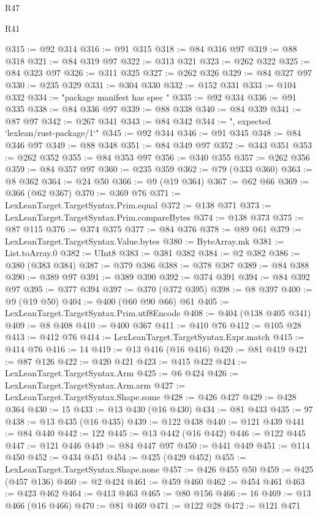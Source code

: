 \begin{lexlean}{R47}
\begin{lexlean}{R41}
\begin{coremodule}
{{{{{{{{{{{{{{{{{{{{{{{{{{{{{{{{{{{{{{{{{{{{{{{{{{{{{{{{{{{{{{{{{{{{{{{{{{{{{{{{{{{{{{{@315 := @92 @314
@316 := @91 @315
@318 := @84 @316 @97
@319 := @88 @318
@321 := @84 @319 @97
@322 := @313 @321
@323 := @262 @322
@325 := @84 @323 @97
@326 := @311 @325
@327 := @262 @326
@329 := @84 @327 @97
@330 := @235 @329
@331 := @304 @330
@332 := @152 @331
@333 := @104 @332
@334 := "package manifest has spec "
@335 := @92 @334
@336 := @91 @335
@338 := @84 @336 @97
@339 := @88 @338
@340 := @84 @339
@341 := @87 @97
@342 := @267 @341
@343 := @84 @342
@344 := ", expected `lexlean/rust-package/1`"
@345 := @92 @344
@346 := @91 @345
@348 := @84 @346 @97
@349 := @88 @348
@351 := @84 @349 @97
@352 := @343 @351
@353 := @262 @352
@355 := @84 @353 @97
@356 := @340 @355
@357 := @262 @356
@359 := @84 @357 @97
@360 := @235 @359
@362 := @79 (@333 @360)
@363 := @8 @362
@364 := @24 @50
@366 := @9 (@19 @364)
@367 := @62 @66
@369 := @366 (@62 @367)
@370 := @369 @76
@371 := LexLeanTarget.TargetSyntax.Prim.equal
@372 := @138 @371
@373 := LexLeanTarget.TargetSyntax.Prim.compareBytes
@374 := @138 @373
@375 := @87 @115
@376 := @374 @375
@377 := @84 @376
@378 := @89 @61
@379 := LexLeanTarget.TargetSyntax.Value.bytes
@380 := ByteArray.mk
@381 := List.toArray.{0}
@382 := UInt8
@383 := @381 @382
@384 := @2 @382
@386 := @380 (@383 @384)
@387 := @379 @386
@388 := @378 @387
@389 := @84 @388
@390 := @389 @97
@391 := @389 @390
@392 := @374 @391
@394 := @84 @392 @97
@395 := @377 @394
@397 := @370 (@372 @395)
@398 := @8 @397
@400 := @9 (@19 @50)
@404 := @400 (@60 @90 @66) @61
@405 := LexLeanTarget.TargetSyntax.Prim.utf8Encode
@408 := @404 (@138 @405 @341)
@409 := @8 @408
@410 := @400 @367
@411 := @410 @76
@412 := @105 @28
@413 := @412 @76
@414 := LexLeanTarget.TargetSyntax.Expr.match
@415 := @414 @76
@416 := 14
@419 := @13 @416 (@16 @416)
@420 := @81 @419
@421 := @87 @126
@422 := @420 @421
@423 := @415 @422
@424 := LexLeanTarget.TargetSyntax.Arm
@425 := @6 @424
@426 := LexLeanTarget.TargetSyntax.Arm.arm
@427 := LexLeanTarget.TargetSyntax.Shape.some
@428 := @426 @427
@429 := @428 @364
@430 := 15
@433 := @13 @430 (@16 @430)
@434 := @81 @433
@435 := 97
@438 := @13 @435 (@16 @435)
@439 := @122 @438
@440 := @121 @439
@441 := @84 @440
@442 := 122
@445 := @13 @442 (@16 @442)
@446 := @122 @445
@447 := @121 @446
@449 := @84 @447 @97
@450 := @441 @449
@451 := @114 @450
@452 := @434 @451
@454 := @425 (@429 @452)
@455 := LexLeanTarget.TargetSyntax.Shape.none
@457 := @426 @455 @50
@459 := @425 (@457 @136)
@460 := @2 @424
@461 := @459 @460
@462 := @454 @461
@463 := @423 @462
@464 := @413 @463
@465 := @80 @156
@466 := 16
@469 := @13 @466 (@16 @466)
@470 := @81 @469
@471 := @122 @28
@472 := @121 @471
}}}}}}}}}}}}}}}}}}}}}}}}}}}}}}}}}}}}}}}}}}}}}}}}}}}}}}}}}}}}}}}}}}}}}}}}}}}}}}}}}}}}}}}
\end{coremodule}
\end{lexlean}
\end{lexlean}
